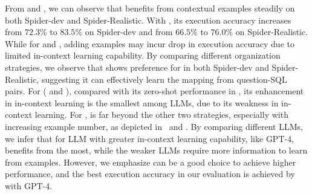 From  and , we can observe that \gptfour benefits from contextual examples steadily on both Spider-dev and Spider-Realistic. 
With \pairorg, its execution accuracy increases from $72.3\%$ to $83.5\%$ on Spider-dev and from $66.5\%$ to $76.0\%$ on Spider-Realistic. 
While for \chatgpt and \davinci, adding examples may incur drop in execution accuracy due to limited in-context learning capability. 
By comparing different organization strategies, we observe that \gptfour shows preference for \pairorg in both Spider-dev and Spider-Realistic, suggesting it can effectively learn the mapping from question-SQL pairs. 
For \chatgpt ( and ), compared with its zero-shot performance in , its enhancement in in-context learning is the smallest among  LLMs, due to its weakness in in-context learning.
For \davinci, \fiorg is far beyond the other two strategies, especially with increasing example number, as depicted in~ and . 
By comparing different LLMs, we infer that for LLM with greater in-context learning capability, like GPT-4, benefits from \pairorg the most, while the weaker LLMs require more information to learn from examples. 
However, we emphasize \pairorg can be a good choice to achieve higher performance, and 
the best execution accuracy in our evaluation is achieved by \pairorg with GPT-4. 

